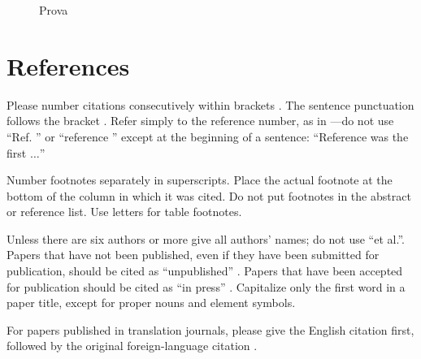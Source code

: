 \documentclass[conference]{IEEEtran}
\begin{document}
\begin{figure}[ht]
  \centering
  \caption{Prova}
  \label{fig:animation}
\end{figure}



\section*{References}

Please number citations consecutively within brackets \cite{b1}. The 
sentence punctuation follows the bracket \cite{b2}. Refer simply to the reference 
number, as in \cite{b3}---do not use ``Ref. \cite{b3}'' or ``reference \cite{b3}'' except at 
the beginning of a sentence: ``Reference \cite{b3} was the first $\ldots$''

Number footnotes separately in superscripts. Place the actual footnote at 
the bottom of the column in which it was cited. Do not put footnotes in the 
abstract or reference list. Use letters for table footnotes.

Unless there are six authors or more give all authors' names; do not use 
``et al.''. Papers that have not been published, even if they have been 
submitted for publication, should be cited as ``unpublished'' \cite{b4}. Papers 
that have been accepted for publication should be cited as ``in press'' \cite{b5}. 
Capitalize only the first word in a paper title, except for proper nouns and 
element symbols.

For papers published in translation journals, please give the English 
citation first, followed by the original foreign-language citation \cite{b6}.
\end{document}
